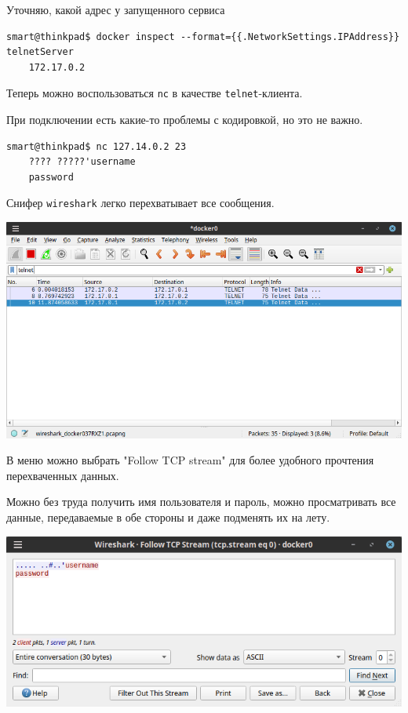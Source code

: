 Уточняю, какой адрес у запущенного сервиса
\begin{Verbatim}[frame=single,breaklines=true,breakanywhere=true]
    smart@thinkpad$ docker inspect --format={{.NetworkSettings.IPAddress}} telnetServer
    172.17.0.2
\end{Verbatim}

Теперь можно воспользоваться \texttt{nc} в качестве \texttt{telnet}-клиента.

При подключении есть какие-то проблемы с кодировкой, но это не важно.

\begin{Verbatim}[frame=single,breaklines=true,breakanywhere=true]
    smart@thinkpad$ nc 127.14.0.2 23
    ???? ?????'username
    password
\end{Verbatim}

\newpage

Снифер \texttt{wireshark} легко перехватывает все сообщения.
\begin{center}
    \includegraphics[scale=0.55]{res/5.wireshark-telnet.png}
\end{center}

В меню можно выбрать "Follow TCP stream" для более удобного прочтения перехваченных данных.

Можно без труда получить имя пользователя и пароль, можно просматривать все данные, передаваемые в обе стороны и даже подменять их на лету.

\begin{center}
    \includegraphics[scale=0.7]{res/5.wireshark-follow-stream.png}
\end{center}

